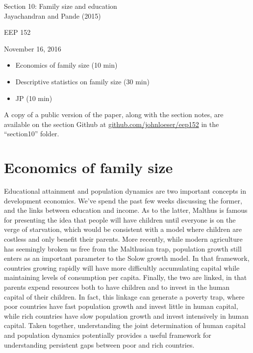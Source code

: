 \documentclass[12pt,english]{article}
\begin{document}
\begin{center}
{\Large{}Section 10: Family size and education} \\
{\large{}Jayachandran and Pande (2015)}
\par\end{center}{\Large \par}

\begin{center}
EEP 152
\par\end{center}

\begin{center}
November 16, 2016
\par\end{center}

\begin{itemize}
	\setlength\itemsep{-0.5em}
	\item Economics of family size (10 min)
	\item Descriptive statistics on family size (30 min)
	\item JP (10 min)
\end{itemize}
A copy of a public version of the paper, along with the section notes, are available on the section Github at \href{github.com/johnloeser/eep152}{github.com/johnloeser/eep152} in the ``section10'' folder.

\section{Economics of family size}

Educational attainment and population dynamics are two important concepts in development economics. We've spend the past few weeks discussing the former, and the links between education and income. As to the latter, Malthus is famous for presenting the idea that people will have children until everyone is on the verge of starvation, which would be consistent with a model where children are costless and only benefit their parents. More recently, while modern agriculture has seemingly broken us free from the Malthusian trap, population growth still enters as an important parameter to the Solow growth model. In that framework, countries growing rapidly will have more difficultly accumulating capital while maintaining levels of consumption per capita. Finally, the two are linked, in that parents expend resources both to have children and to invest in the human capital of their children. In fact, this linkage can generate a poverty trap, where poor countries have fast population growth and invest little in human capital, while rich countries have slow population growth and invest intensively in human capital. Taken together, understanding the joint determination of human capital and population dynamics potentially provides a useful framework for understanding persistent gaps between poor and rich countries.
\end{document}
